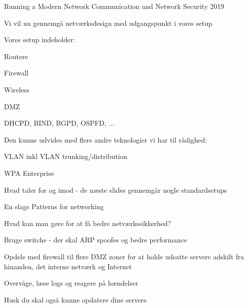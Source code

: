 \documentclass[Screen16to9,17pt]{foils}
\begin{document}
\mytitlepage
{Running a Modern Network}
{Communication and Network Security 2019}




\begin{list1}
\item Vi vil nu gennemgå netværksdesign med udgangspunkt i vores setup
\item Vores setup indeholder:
\begin{list2}
\item Routere
\item Firewall
\item Wireless
\item DMZ
\item DHCPD, BIND, BGPD, OSPFD, ...
\end{list2}
\item Den kunne udvides med flere andre teknologier vi har til rådighed:
\begin{list2}
\item VLAN inkl VLAN trunking/distribution
\item WPA Enterprise
\end{list2}
\item Hvad taler for og imod - de næste slides gennemgår nogle standardsetups
\item En slags Patterns for networking
\end{list1}






\begin{list1}
\item Hvad kan man gøre for at få bedre netværkssikkerhed?
\begin{list2}
\item Bruge switche - der skal ARP spoofes og bedre performance
\item Opdele med firewall til flere DMZ zoner for at holde
      udsatte servere adskilt fra hinanden, det interne netværk og
      Internet
\item Overvåge, læse logs og reagere på hændelser
\end{list2}
\item Husk du skal også kunne opdatere dine servere
\end{list1}


\end{document}
